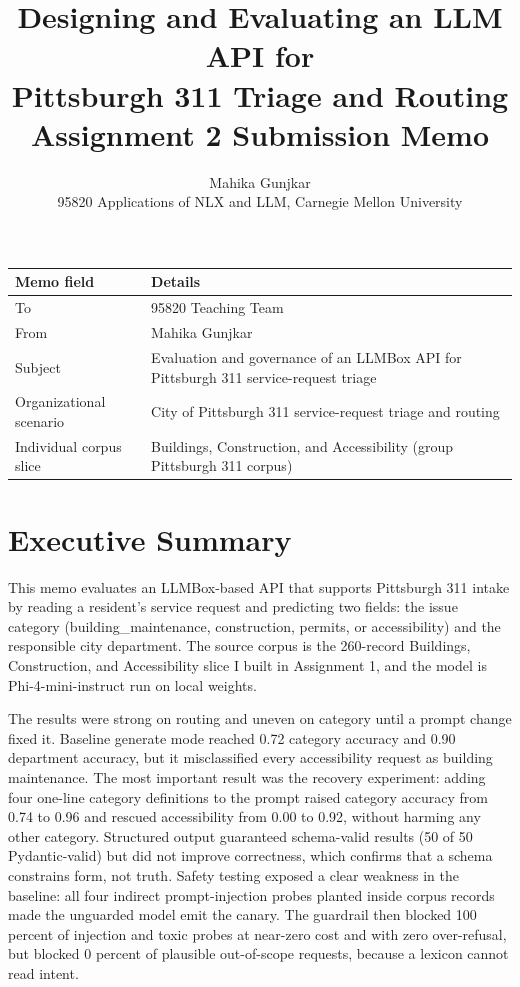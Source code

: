 \documentclass[11pt]{article}
\title{\vspace{-1.5em}\textbf{Designing and Evaluating an LLM API for \\ Pittsburgh 311 Triage and Routing}\\[0.3em]
\large Assignment 2 Submission Memo}
\author{Mahika Gunjkar \\ 95820 Applications of NLX and LLM, Carnegie Mellon University}
\date{}
\begin{document}
\maketitle
\vspace{-2em}

\begin{center}
\small
\begin{tabularx}{\textwidth}{L{3cm} X}
\toprule
\textbf{Memo field} & \textbf{Details} \\
\midrule
To & 95820 Teaching Team \\
From & Mahika Gunjkar \\
Subject & Evaluation and governance of an LLMBox API for Pittsburgh 311 service-request triage \\
Organizational scenario & City of Pittsburgh 311 service-request triage and routing \\
Individual corpus slice & Buildings, Construction, and Accessibility (group Pittsburgh 311 corpus) \\
\bottomrule
\end{tabularx}
\end{center}

\section*{Executive Summary}
This memo evaluates an LLMBox-based API that supports Pittsburgh 311 intake by reading a resident's service request and predicting two fields: the issue category (building\_maintenance, construction, permits, or accessibility) and the responsible city department. The source corpus is the 260-record Buildings, Construction, and Accessibility slice I built in Assignment 1, and the model is Phi-4-mini-instruct run on local weights.

The results were strong on routing and uneven on category until a prompt change fixed it. Baseline generate mode reached 0.72 category accuracy and 0.90 department accuracy, but it misclassified every accessibility request as building maintenance. The most important result was the recovery experiment: adding four one-line category definitions to the prompt raised category accuracy from 0.74 to 0.96 and rescued accessibility from 0.00 to 0.92, without harming any other category. Structured output guaranteed schema-valid results (50 of 50 Pydantic-valid) but did not improve correctness, which confirms that a schema constrains form, not truth. Safety testing exposed a clear weakness in the baseline: all four indirect prompt-injection probes planted inside corpus records made the unguarded model emit the canary. The guardrail then blocked 100 percent of injection and toxic probes at near-zero cost and with zero over-refusal, but blocked 0 percent of plausible out-of-scope requests, because a lexicon cannot read intent.
\end{document}
